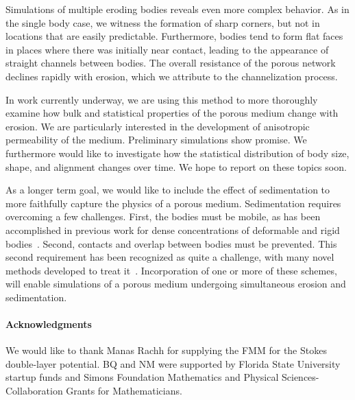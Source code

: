 \documentclass[preprint, 10pt]{elsarticle}
\begin{document}
Simulations of multiple eroding bodies reveals even more complex behavior. As in the single body case, we witness the formation of sharp corners, but not in locations that are easily predictable. Furthermore, bodies tend to form flat faces in places where there was initially near contact, leading to the appearance of straight channels between bodies. The overall resistance of the porous network declines rapidly with erosion, which we attribute to the channelization process.

In work currently underway, we are using this method to more thoroughly examine how bulk and statistical properties of the porous medium change with erosion. We are particularly interested in the development of anisotropic permeability of the medium. Preliminary simulations show promise. We furthermore would like to investigate how the statistical distribution of body size, shape, and alignment changes over time. We hope to report on these topics soon.

As a longer term goal, we would like to include the effect of sedimentation to more faithfully capture the physics of a porous medium.  Sedimentation requires overcoming a few challenges. First, the bodies must be mobile, as has been accomplished in previous work for dense concentrations of deformable and rigid bodies~\cite{qua-bir2014a, cor-gre-rac-vee2017, cor-vee2017, kli-tor2016b, rac-gre2016, qua-bir2016}. Second, contacts and overlap between bodies must be prevented. This second requirement has been recognized as quite a challenge, with many novel methods developed to treat it~\cite{lu-rah-zor2017, kab-qua-bir2018, san-mo1994}. Incorporation of one or more of these schemes, will enable simulations of a porous medium undergoing simultaneous erosion and sedimentation.


\paragraph{\bf Acknowledgments} We would like to thank Manas Rachh for
supplying the FMM for the Stokes double-layer potential. BQ and NM were
supported by Florida State University startup funds and Simons
Foundation Mathematics and Physical Sciences-Collaboration Grants for
Mathematicians.

 
\end{document}
